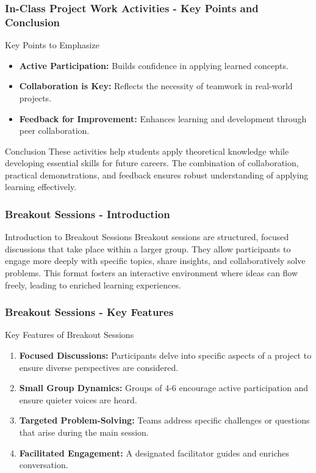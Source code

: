 \documentclass[aspectratio=169]{beamer}
\begin{document}
\begin{frame}[fragile]
  \frametitle{In-Class Project Work Activities - Key Points and Conclusion}
  \begin{block}{Key Points to Emphasize}
    \begin{itemize}
      \item \textbf{Active Participation:} Builds confidence in applying learned concepts.
      \item \textbf{Collaboration is Key:} Reflects the necessity of teamwork in real-world projects.
      \item \textbf{Feedback for Improvement:} Enhances learning and development through peer collaboration.
    \end{itemize}
  \end{block}
  
  \begin{block}{Conclusion}
    These activities help students apply theoretical knowledge while developing essential skills for future careers. 
    The combination of collaboration, practical demonstrations, and feedback ensures robust understanding of applying learning effectively.
  \end{block}
\end{frame}

\begin{frame}[fragile]
    \frametitle{Breakout Sessions - Introduction}
    \begin{block}{Introduction to Breakout Sessions}
        Breakout sessions are structured, focused discussions that take place within a larger group. They allow participants to engage more deeply with specific topics, share insights, and collaboratively solve problems. This format fosters an interactive environment where ideas can flow freely, leading to enriched learning experiences.
    \end{block}
\end{frame}

\begin{frame}[fragile]
    \frametitle{Breakout Sessions - Key Features}
    \begin{block}{Key Features of Breakout Sessions}
        \begin{enumerate}
            \item \textbf{Focused Discussions:} Participants delve into specific aspects of a project to ensure diverse perspectives are considered.
            \item \textbf{Small Group Dynamics:} Groups of 4-6 encourage active participation and ensure quieter voices are heard.
            \item \textbf{Targeted Problem-Solving:} Teams address specific challenges or questions that arise during the main session.
            \item \textbf{Facilitated Engagement:} A designated facilitator guides and enriches conversation.
        \end{enumerate}
    \end{block}
\end{frame}
\end{document}
